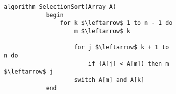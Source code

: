 \documentclass{subfiles}
\begin{document}
\begin{figure}[!h]
    \centering
    \begin{subfigure}[b]{0.5\textwidth}
        \begin{lstlisting}[language = algol]
            algorithm SelectionSort(Array A)
            begin
                for k $\leftarrow$ 1 to n - 1 do 
                    m $\leftarrow$ k

                    for j $\leftarrow$ k + 1 to n do
                        if (A[j] < A[m]) then m $\leftarrow$ j
                    switch A[m] and A[k]
            end
        \end{lstlisting}
    \end{subfigure}
    \label{Fig:}
\end{figure}
\end{document}
